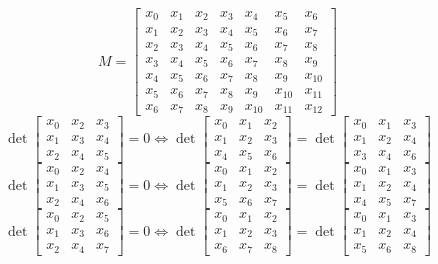 $$ M = \left[\begin{matrix}x_{0} & x_{1} & x_{2} & x_{3} & x_{4} & x_{5} & x_{6}\\x_{1} & x_{2} & x_{3} & x_{4} & x_{5} & x_{6} & x_{7}\\x_{2} & x_{3} & x_{4} & x_{5} & x_{6} & x_{7} & x_{8}\\x_{3} & x_{4} & x_{5} & x_{6} & x_{7} & x_{8} & x_{9}\\x_{4} & x_{5} & x_{6} & x_{7} & x_{8} & x_{9} & x_{10}\\x_{5} & x_{6} & x_{7} & x_{8} & x_{9} & x_{10} & x_{11}\\x_{6} & x_{7} & x_{8} & x_{9} & x_{10} & x_{11} & x_{12}\end{matrix}\right] $$
$$ \det \left[\begin{matrix}x_{0} & x_{2} & x_{3}\\x_{1} & x_{3} & x_{4}\\x_{2} & x_{4} & x_{5}\end{matrix}\right] = 0 \Leftrightarrow \det \left[\begin{matrix}x_{0} & x_{1} & x_{2}\\x_{1} & x_{2} & x_{3}\\x_{4} & x_{5} & x_{6}\end{matrix}\right] = \det \left[\begin{matrix}x_{0} & x_{1} & x_{3}\\x_{1} & x_{2} & x_{4}\\x_{3} & x_{4} & x_{6}\end{matrix}\right] $$
$$ \det \left[\begin{matrix}x_{0} & x_{2} & x_{4}\\x_{1} & x_{3} & x_{5}\\x_{2} & x_{4} & x_{6}\end{matrix}\right] = 0 \Leftrightarrow \det \left[\begin{matrix}x_{0} & x_{1} & x_{2}\\x_{1} & x_{2} & x_{3}\\x_{5} & x_{6} & x_{7}\end{matrix}\right] = \det \left[\begin{matrix}x_{0} & x_{1} & x_{3}\\x_{1} & x_{2} & x_{4}\\x_{4} & x_{5} & x_{7}\end{matrix}\right] $$
$$ \det \left[\begin{matrix}x_{0} & x_{2} & x_{5}\\x_{1} & x_{3} & x_{6}\\x_{2} & x_{4} & x_{7}\end{matrix}\right] = 0 \Leftrightarrow \det \left[\begin{matrix}x_{0} & x_{1} & x_{2}\\x_{1} & x_{2} & x_{3}\\x_{6} & x_{7} & x_{8}\end{matrix}\right] = \det \left[\begin{matrix}x_{0} & x_{1} & x_{3}\\x_{1} & x_{2} & x_{4}\\x_{5} & x_{6} & x_{8}\end{matrix}\right] $$
